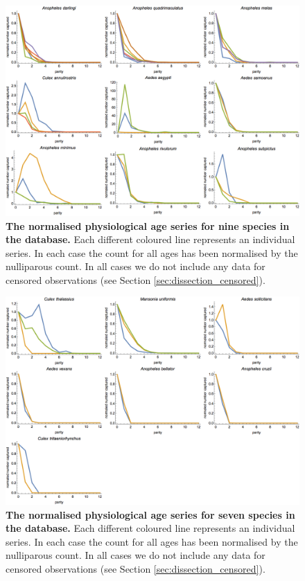 \documentclass[12pt]{article}
\begin{document}
{\begin{figure}[ht]
	\centerline{\includegraphics[width=1.3\textwidth]{./Figure_files/dissection_parity_data2.png}}
	\caption{\textbf{The normalised physiological age series for nine species in the database.} Each different coloured line represents an individual series. In each case the count for all ages has been normalised by the nulliparous count. In all cases we do not include any data for censored observations (see Section \ref{sec:dissection_censored}).}\label{fig:dissection_exampleData2}
\end{figure}

\begin{figure}[ht]
	\centerline{\includegraphics[width=1.3\textwidth]{./Figure_files/dissection_parity_data3.png}}
	\caption{\textbf{The normalised physiological age series for seven species in the database.} Each different coloured line represents an individual series. In each case the count for all ages has been normalised by the nulliparous count. In all cases we do not include any data for censored observations (see Section \ref{sec:dissection_censored}).}\label{fig:dissection_exampleData3}
\end{figure}


}
\end{document}
